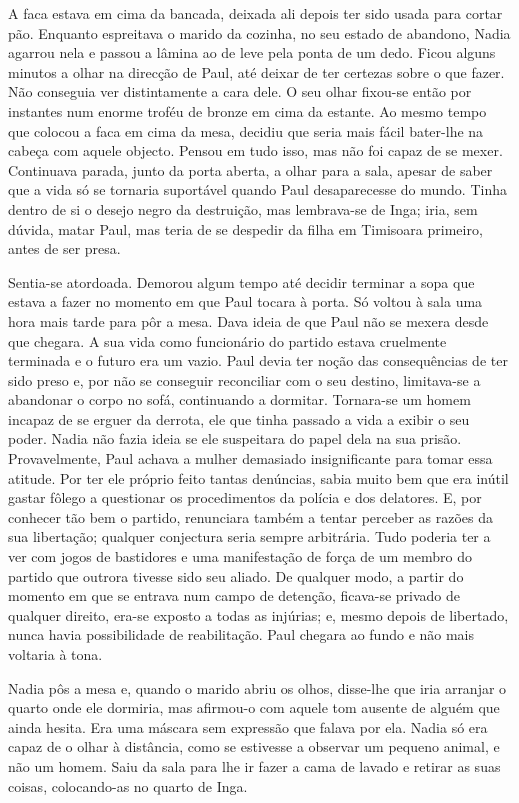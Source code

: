 A faca estava em cima da bancada, deixada ali depois ter sido usada para
cortar pão. Enquanto espreitava o marido da cozinha, no seu estado de
abandono, Nadia agarrou nela e passou a lâmina ao de leve pela ponta de
um dedo. Ficou alguns minutos a olhar na direcção de Paul, até deixar de
ter certezas sobre o que fazer. Não conseguia ver distintamente a cara
dele. O seu olhar fixou-se então por instantes num enorme troféu de
bronze em cima da estante. Ao mesmo tempo que colocou a faca em cima da
mesa,
decidiu que seria mais fácil bater-lhe na cabeça com aquele objecto.
Pensou em tudo isso, mas não foi capaz de se mexer. Continuava parada,
junto da porta aberta, a olhar para a sala, apesar de saber que a vida
só se tornaria suportável quando Paul desaparecesse do mundo. Tinha
dentro de si o desejo negro da destruição, mas lembrava-se de Inga;
iria, sem dúvida, matar Paul, mas teria de se despedir da filha em
Timisoara primeiro, antes de ser presa.

Sentia-se atordoada. Demorou algum tempo até decidir terminar a sopa que
estava a fazer no momento em que Paul tocara à porta. Só voltou à sala
uma hora mais tarde para pôr a mesa. Dava ideia de que Paul não se
mexera desde que chegara. A sua vida como funcionário do partido
estava cruelmente terminada e o futuro era um vazio. Paul devia ter
noção das consequências de ter sido preso e, por não se conseguir
reconciliar com o seu destino, limitava-se a abandonar o corpo no sofá,
continuando a dormitar. Tornara-se um homem incapaz de se erguer da
derrota, ele que tinha passado a vida a exibir o seu poder. Nadia não
fazia ideia se ele suspeitara do papel dela na sua prisão.
Provavelmente, Paul achava a mulher demasiado insignificante para
tomar essa atitude. Por ter ele próprio feito tantas denúncias, sabia
muito bem que era inútil gastar fôlego a questionar os procedimentos da
polícia e dos delatores. E, por conhecer tão bem o partido, renunciara
também a tentar perceber as razões da sua libertação; qualquer
conjectura seria sempre arbitrária. Tudo poderia ter a ver com jogos de
bastidores e uma manifestação de força de um membro do partido que
outrora tivesse sido seu aliado. De qualquer modo, a partir do momento em que se entrava num campo de detenção, ficava-se
privado de qualquer direito, era-se exposto a todas as injúrias; e,
mesmo depois de libertado, nunca havia possibilidade de reabilitação.
Paul chegara ao fundo e não mais voltaria à tona.

Nadia pôs a mesa e, quando o marido abriu os olhos, disse-lhe que iria
arranjar o quarto onde ele dormiria, mas afirmou-o com aquele tom
ausente de alguém que ainda hesita. Era uma máscara sem expressão que
falava por ela. Nadia só era capaz de o olhar à distância, como se estivesse a observar um pequeno animal, e não um homem. Saiu da sala para
lhe ir fazer a cama de lavado e retirar as suas coisas, colocando-as no
quarto de Inga.

